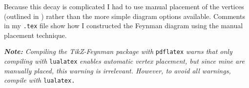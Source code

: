 \documentclass[12pt, letterpaper]{article}
\begin{document}
Because this decay is complicated I had to use manual placement of the vertices (outlined in \citet[Sec 2.4.3]{Ellis2016}) rather than the more simple diagram options available. Comments in my \texttt{.tex} file show how I constructed the Feynman diagram using the manual placement technique.

\vspace{4mm}
\noindent \emph{\textbf{Note:} Compiling the TikZ-Feynman package with} \texttt{pdflatex} \emph{warns that only compiling with} \texttt{lualatex} \emph{enables automatic vertex placement, but since mine are manually placed, this warning is irrelevant. However, to avoid all warnings, compile with} \texttt{lualatex.}



\clearpage




\end{document}
